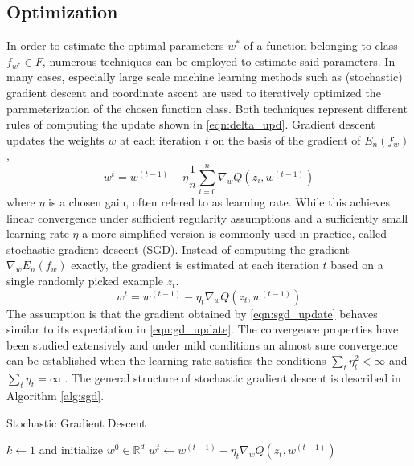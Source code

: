 \subsection{Optimization}
\label{ss:optimization}
In order to estimate the optimal parameters $w^*$ of a function belonging to class $f_{w^*} \in F$, numerous techniques can be employed to estimate said parameters.
In many cases, especially large scale machine learning methods such as (stochastic) gradient descent and coordinate ascent are used to iteratively optimized the parameterization of the chosen function class.
Both techniques represent different rules of computing the update shown in \ref{eqn:delta_upd}.
Gradient descent updates the weights $w$ at each iteration $t$ on the basis of the gradient of $E_n(f_w)$,
\begin{equation}
w^{t} = w^{(t-1)} - \eta\frac{1}{n}\sum_{i=0}^{n}\nabla_wQ(z_i,w^{(t-1)})
\label{eqn:gd_update}
\end{equation}
where $\eta$ is a chosen gain, often refered to as learning rate.
While this achieves linear convergence under sufficient regularity assumptions and a sufficiently small learning rate $\eta$ \cite{dennis1996numerical} \cite{bottou2010large} a more simplified version is commonly used in practice, called stochastic gradient descent (SGD).
Instead of computing the gradient $\nabla_wE_n(f_w)$ exactly, the gradient is estimated at each iteration $t$ based on a single randomly picked example $z_t$.
\begin{equation}
w^{t} = w^{(t-1)} - \eta_t\nabla_wQ(z_t,w^{(t-1)})
\label{eqn:sgd_update}
\end{equation}
The assumption is that the gradient obtained by \ref{eqn:sgd_update} behaves similar to its expectiation in \ref{eqn:gd_update}.
The convergence properties have been studied extensively and under mild conditions an almost sure convergence can be established when the learning rate satisfies the conditions $\sum_t\eta_t^2 < \infty$ and $\sum_t\eta_t = \infty$ \cite{bottou2010large}.
The general structure of stochastic gradient descent is described in Algorithm \ref{alg:sgd}.

\begin{algorithm}
\caption{Stochastic Gradient Descent}\label{alg:sgd}
\begin{algorithmic}[1]
\State $k\gets 1$ and initialize $w^0 \in \mathbb{R}^d$
\Repeat
\For{}
\State $w^{t} \gets w^{(t-1)} - \eta_t\nabla_wQ(z_t,w^{(t-1)})$
\EndFor
{}
\end{algorithmic}
\end{algorithm}

